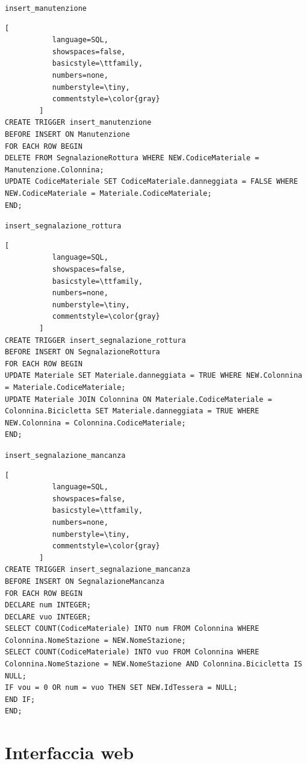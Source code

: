 \documentclass[a4paper,twoside]{article}
\begin{document}
\texttt{insert\_manutenzione}
\begin{lstlisting}[
           language=SQL,
           showspaces=false,
           basicstyle=\ttfamily,
           numbers=none,
           numberstyle=\tiny,
           commentstyle=\color{gray}
        ]
CREATE TRIGGER insert_manutenzione
BEFORE INSERT ON Manutenzione
FOR EACH ROW BEGIN
DELETE FROM SegnalazioneRottura WHERE NEW.CodiceMateriale = Manutenzione.Colonnina;
UPDATE CodiceMateriale SET CodiceMateriale.danneggiata = FALSE WHERE NEW.CodiceMateriale = Materiale.CodiceMateriale;
END;
\end{lstlisting}
\texttt{insert\_segnalazione\_rottura}
\begin{lstlisting}[
           language=SQL,
           showspaces=false,
           basicstyle=\ttfamily,
           numbers=none,
           numberstyle=\tiny,
           commentstyle=\color{gray}
        ]
CREATE TRIGGER insert_segnalazione_rottura
BEFORE INSERT ON SegnalazioneRottura
FOR EACH ROW BEGIN
UPDATE Materiale SET Materiale.danneggiata = TRUE WHERE NEW.Colonnina = Materiale.CodiceMateriale;
UPDATE Materiale JOIN Colonnina ON Materiale.CodiceMateriale = Colonnina.Bicicletta SET Materiale.danneggiata = TRUE WHERE NEW.Colonnina = Colonnina.CodiceMateriale;
END;
\end{lstlisting}
\texttt{insert\_segnalazione\_mancanza}
\begin{lstlisting}[
           language=SQL,
           showspaces=false,
           basicstyle=\ttfamily,
           numbers=none,
           numberstyle=\tiny,
           commentstyle=\color{gray}
        ]
CREATE TRIGGER insert_segnalazione_mancanza
BEFORE INSERT ON SegnalazioneMancanza
FOR EACH ROW BEGIN
DECLARE num INTEGER;
DECLARE vuo INTEGER;
SELECT COUNT(CodiceMateriale) INTO num FROM Colonnina WHERE Colonnina.NomeStazione = NEW.NomeStazione;
SELECT COUNT(CodiceMateriale) INTO vuo FROM Colonnina WHERE Colonnina.NomeStazione = NEW.NomeStazione AND Colonnina.Bicicletta IS NULL;
IF vou = 0 OR num = vuo THEN SET NEW.IdTessera = NULL;
END IF;
END;
\end{lstlisting}

\section{Interfaccia web}
\end{document}

